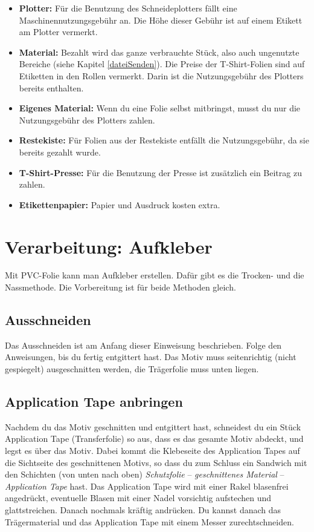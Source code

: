 \documentclass{\basedir/fablab-document}
\begin{document}
\begin{itemize}
 \item \textbf{Plotter:} Für die Benutzung des Schneideplotters fällt eine Maschinennutzungsgebühr an.
 Die Höhe dieser Gebühr ist auf einem Etikett am Plotter vermerkt.
 \item \textbf{Material:} Bezahlt wird das ganze verbrauchte Stück, also auch ungenutzte Bereiche (siehe Kapitel \ref{dateiSenden}).
 Die Preise der T-Shirt-Folien sind auf Etiketten in den Rollen vermerkt.
 Darin ist die Nutzungsgebühr des Plotters bereits enthalten.
 \item \textbf{Eigenes Material:} Wenn du eine Folie selbst mitbringst, musst du nur die Nutzungsgebühr des Plotters zahlen.
 \item \textbf{Restekiste:} Für Folien aus der Restekiste entfällt die Nutzungsgebühr, da sie bereits gezahlt wurde.
 \item \textbf{T-Shirt-Presse:} Für die Benutzung der Presse ist zusätzlich ein Beitrag zu zahlen.
 \item \textbf{Etikettenpapier:} Papier und Ausdruck kosten extra.
\end{itemize}

\section{Verarbeitung: Aufkleber}
Mit PVC-Folie kann man Aufkleber erstellen.
Dafür gibt es die Trocken- und die Nassmethode.
Die Vorbereitung ist für beide Methoden gleich.
\subsection{Ausschneiden}
Das Ausschneiden ist am Anfang dieser Einweisung beschrieben.
Folge den Anweisungen, bis du fertig entgittert hast.
Das Motiv muss seitenrichtig (nicht gespiegelt) ausgeschnitten werden, die Trägerfolie muss unten liegen. 

\subsection{Application Tape anbringen}
Nachdem du das Motiv geschnitten und entgittert hast, schneidest du ein Stück Application Tape (Transferfolie) so aus, dass es das gesamte Motiv abdeckt, und legst es über das Motiv.
Dabei kommt die Klebeseite des Application Tapes auf die Sichtseite des geschnittenen Motivs, so dass du zum Schluss ein Sandwich mit den Schichten (von unten nach oben) \textit{Schutzfolie} -- \textit{geschnittenes Material} -- \textit{Application Tape} hast.
Das Application Tape wird mit einer Rakel blasenfrei angedrückt, eventuelle Blasen mit einer Nadel vorsichtig aufstechen und glattstreichen.
Danach nochmals kräftig andrücken.
Du kannst danach das Trägermaterial und das Application Tape mit einem Messer zurechtschneiden.
\end{document}
